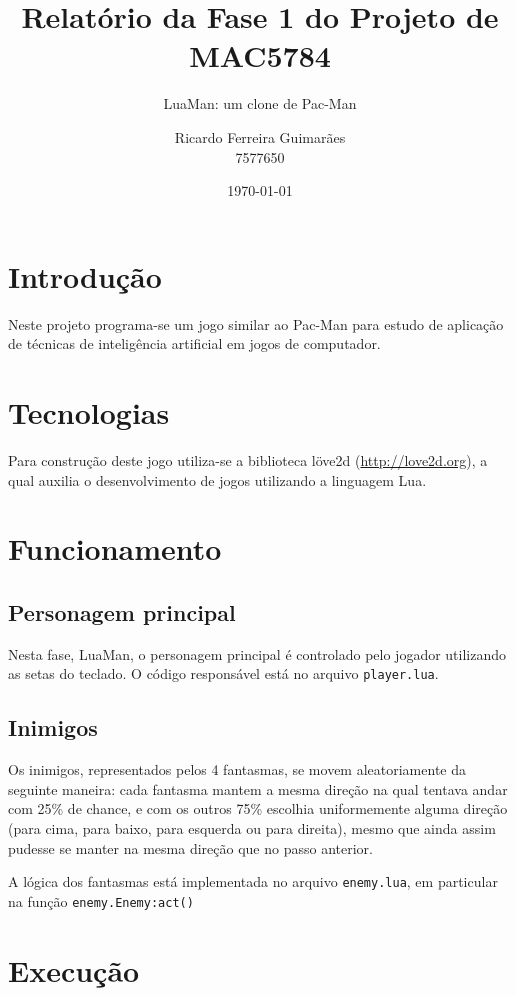 \documentclass[a4paper]{scrartcl}
\title{Relatório da Fase 1 do Projeto de MAC5784}
\subtitle{LuaMan: um clone de Pac-Man}
\author{Ricardo Ferreira Guimarães \\ 7577650}
\date{\today}
\begin{document}
\maketitle

\section{Introdução}

Neste projeto programa-se um jogo similar ao Pac-Man para estudo de aplicação de
técnicas de inteligência artificial em jogos de computador.

\section{Tecnologias}

Para construção deste jogo utiliza-se a biblioteca löve2d (\url{http://love2d.org}),
a qual auxilia o desenvolvimento de jogos utilizando a linguagem Lua.

\section{Funcionamento}

\subsection{Personagem principal}

Nesta fase, LuaMan, o personagem principal é controlado pelo jogador utilizando as setas do teclado.
O código responsável está no arquivo \texttt{player.lua}.

\subsection{Inimigos}

Os inimigos, representados pelos 4 fantasmas, se movem aleatoriamente da seguinte maneira:
cada fantasma mantem a mesma direção na qual tentava andar com 25\% de chance, e com os outros 75\%
escolhia uniformemente alguma direção (para cima, para baixo, para esquerda ou para direita), mesmo
que ainda assim pudesse se manter na mesma direção que no passo anterior.

A lógica dos fantasmas está implementada no arquivo \texttt{enemy.lua}, em particular na função
\texttt{enemy.Enemy:act()}

\section{Execução}
\end{document}
